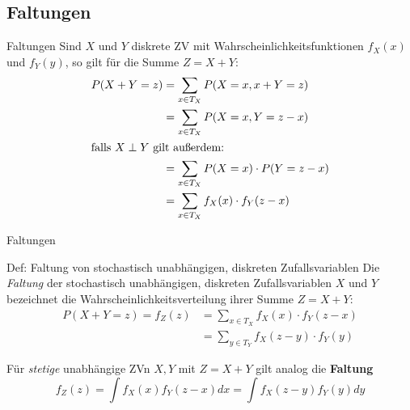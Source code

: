 \documentclass[
  10pt,
  ignorenonframetext,
]{beamer}
\begin{document}
\hypertarget{faltungen}{%
\subsection{Faltungen}\label{faltungen}}

\begin{frame}{Faltungen}
\protect\hypertarget{faltungen-1}{}
Sind \(X\) und \(Y\) diskrete ZV mit Wahrscheinlichkeitsfunktionen
\(f_X(x)\) und \(f_Y(y)\), so gilt für die Summe \(Z = X + Y\):
\begin{align*}
P(X + Y = z) & =  \sum_{x  \in T_X} P(X = x, x + Y = z)\\
& =  \sum_{x  \in T_X} P(X = x, Y = z - x)\\
\intertext{falls $X \perp Y$ gilt außerdem:}
&=  \sum_{x  \in T_X} P(X = x) \cdot P(Y = z - x)\\
& =  \sum_{x  \in T_X} f_X(x) \cdot f_Y(z - x)
\end{align*}
\end{frame}

\begin{frame}{Faltungen}
\protect\hypertarget{faltungen-2}{}
\begin{block}{Def: Faltung von stochastisch unabhängigen, diskreten
Zufallsvariablen}
\protect\hypertarget{def-faltung-von-stochastisch-unabhuxe4ngigen-diskreten-zufallsvariablen}{}
Die \emph{Faltung} der stochastisch unabhängigen, diskreten
Zufallsvariablen \(X\) und \(Y\) bezeichnet die
Wahrscheinlichkeitsverteilung ihrer Summe \(Z = X + Y\): \begin{align*}
P(X + Y = z) = f_Z(z) & =  \sum_{x  \in T_X} f_X(x) \cdot f_Y(z - x) \\
& = \sum_{y \in T_Y} f_X(z-y) \cdot f_Y(y)
\end{align*}
\end{block}

Für \emph{stetige} unabhängige ZVn \(X, Y\) mit \(Z = X + Y\) gilt
analog die \textbf{Faltung}
\[f_Z(z) = \int f_X(x) f_Y(z-x) dx = \int f_X(z-y) f_Y(y) dy\] 
\end{frame}
\end{document}
